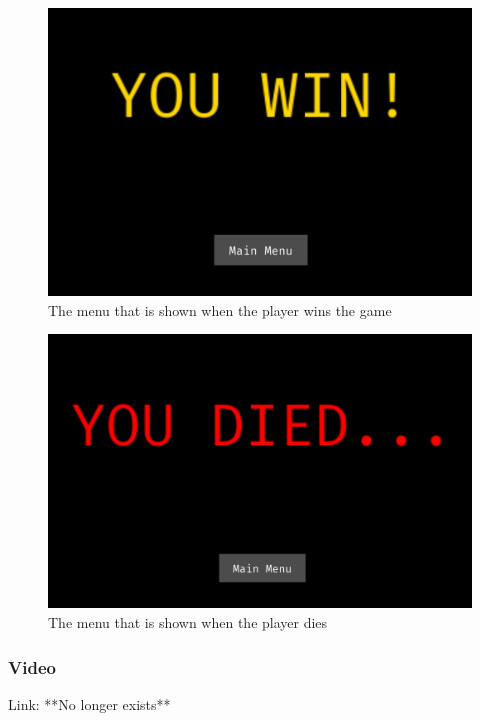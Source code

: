 \documentclass[../Main.tex]{subfiles}
\begin{document}
            \begin{figure}[hbt!]
                \centerline{\includegraphics[scale=0.4]{img/Testing/Objective/WinMenu.png}}
                \caption{The menu that is shown when the player wins the game}
                \label{fig:WinMenu}
            \end{figure}
            \clearpage
            \begin{figure}[hbt!]
                \centerline{\includegraphics[scale=0.4]{img/Testing/Objective/DeathMenu.png}}
                \caption{The menu that is shown when the player dies}
                \label{fig:DeathMenu}
            \end{figure}
        \subsubsection{Video}
            Link: **No longer exists**
\end{document}
